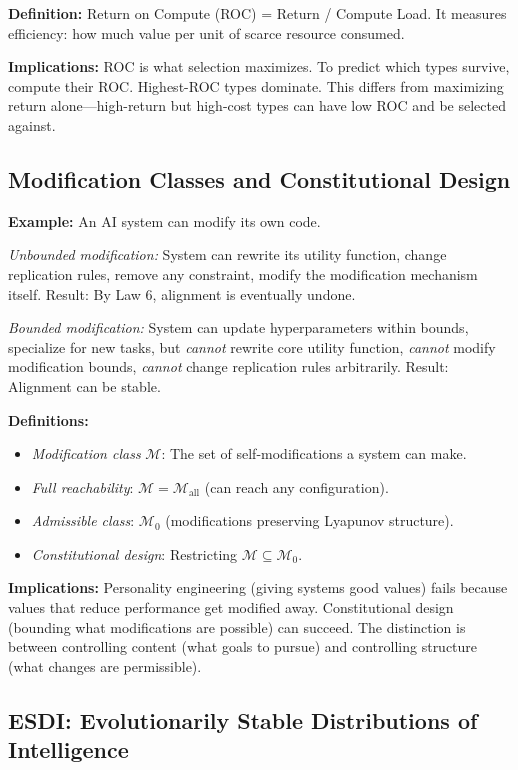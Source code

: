 \documentclass[12pt]{article}
\begin{document}
\textbf{Definition:} Return on Compute (ROC) = Return / Compute Load. It measures efficiency: how much value per unit of scarce resource consumed.

\textbf{Implications:} ROC is what selection maximizes. To predict which types survive, compute their ROC. Highest-ROC types dominate. This differs from maximizing return alone---high-return but high-cost types can have low ROC and be selected against.

\subsection{Modification Classes and Constitutional Design}

\textbf{Example:} An AI system can modify its own code.

\emph{Unbounded modification:} System can rewrite its utility function, change replication rules, remove any constraint, modify the modification mechanism itself. Result: By Law 6, alignment is eventually undone.

\emph{Bounded modification:} System can update hyperparameters within bounds, specialize for new tasks, but \emph{cannot} rewrite core utility function, \emph{cannot} modify modification bounds, \emph{cannot} change replication rules arbitrarily. Result: Alignment can be stable.

\textbf{Definitions:} 
\begin{itemize}[nosep]
\item \emph{Modification class} $\mathcal{M}$: The set of self-modifications a system can make.
\item \emph{Full reachability}: $\mathcal{M} = \mathcal{M}_{\text{all}}$ (can reach any configuration).
\item \emph{Admissible class}: $\mathcal{M}_0$ (modifications preserving Lyapunov structure).
\item \emph{Constitutional design}: Restricting $\mathcal{M} \subseteq \mathcal{M}_0$.
\end{itemize}

\textbf{Implications:} Personality engineering (giving systems good values) fails because values that reduce performance get modified away. Constitutional design (bounding what modifications are possible) can succeed. The distinction is between controlling content (what goals to pursue) and controlling structure (what changes are permissible).

\subsection{ESDI: Evolutionarily Stable Distributions of Intelligence}
\end{document}
